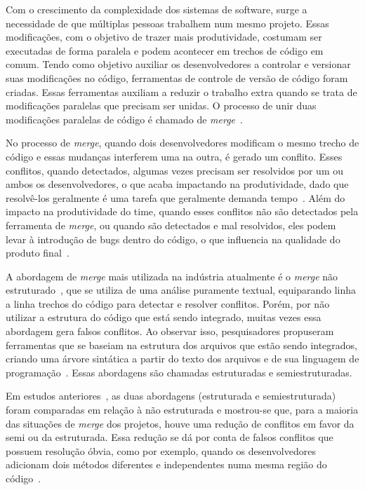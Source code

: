 
Com o crescimento da complexidade dos sistemas de software, surge a necessidade
de que múltiplas pessoas trabalhem num mesmo projeto. Essas modificações, com o
objetivo de trazer mais produtividade, costumam ser executadas de forma
paralela e podem acontecer em trechos de código em comum. Tendo como objetivo
auxiliar os desenvolvedores a controlar e versionar suas modificações no
código, ferramentas de controle de versão de código foram criadas. Essas
ferramentas auxiliam a reduzir o trabalho extra quando se trata de modificações
paralelas que precisam ser unidas. O processo de unir duas modificações
paralelas de código é chamado de \emph{merge}~\cite{mens02}.

No processo de \emph{merge}, quando dois desenvolvedores modificam o mesmo
trecho de código e essas mudanças interferem uma na outra, é gerado um
conflito. Esses conflitos, quando detectados, algumas vezes precisam ser
resolvidos por um ou ambos os desenvolvedores, o que acaba impactando na
produtividade, dado que resolvê-los geralmente é uma tarefa que geralmente
demanda tempo~\cite{brun11}. Além do impacto na produtividade do time, quando
esses conflitos não são detectados pela ferramenta de \emph{merge}, ou quando
são detectados e mal resolvidos, eles podem levar à introdução de bugs dentro
do código, o que influencia na qualidade do produto final~\cite{brin20}.

A abordagem de \emph{merge} mais utilizada na indústria atualmente é o
\emph{merge} não estruturado~\cite{khan07}, que se utiliza de uma análise
puramente textual, equiparando linha a linha trechos do código para detectar e
resolver conflitos. Porém, por não utilizar a estrutura do código que está
sendo integrado, muitas vezes essa abordagem gera falsos conflitos. Ao
observar isso, pesquisadores propuseram ferramentas que se baseiam na estrutura
dos arquivos que estão sendo integrados, criando uma árvore sintática a partir
do texto dos arquivos e de sua linguagem de programação~\cite{apel11}. Essas
abordagens são chamadas estruturadas e semiestruturadas.

Em estudos anteriores~\cite{apel11,cavalcanti15,cavalcanti19}, as duas
abordagens (estruturada e semiestruturada) foram comparadas em relação à não
estruturada e mostrou-se que, para a maioria das situações de \emph{merge} dos
projetos, houve uma redução de conflitos em favor da semi ou da estruturada.
Essa redução se dá por conta de falsos conflitos que possuem resolução óbvia,
como por exemplo, quando os desenvolvedores adicionam dois métodos diferentes e
independentes numa mesma região do código~\cite{cavalcanti17}.

